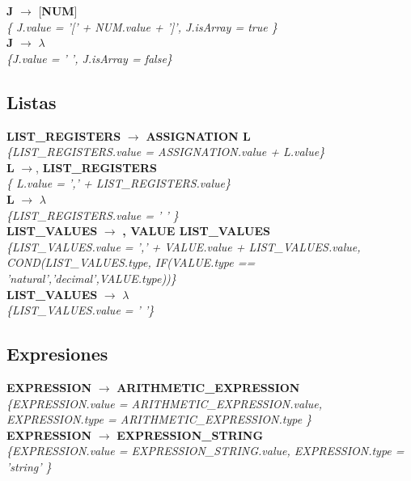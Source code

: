 \documentclass[10pt,a4paper]{article}
\begin{document}
\textbf{J} $\rightarrow$ [\textbf{NUM}] \\
\textit{\{ J.value = '[' + NUM.value + ']', J.isArray = true   \}} \\

\textbf{J} $\rightarrow$ $\lambda$   \\
\textit{\{J.value = ' ', J.isArray = false\}} \\

\subsection{Listas}
\textbf{LIST\_REGISTERS} $\rightarrow$ \textbf{ASSIGNATION L} \\
\textit{\{LIST\_REGISTERS.value =  ASSIGNATION.value + L.value\}} \\

\textbf{L} $\rightarrow$, \textbf{LIST\_REGISTERS} \\
\textit{\{ L.value = ',' + LIST\_REGISTERS.value\}} \\

\textbf{L} $\rightarrow$ $\lambda$\\
\textit{\{LIST\_REGISTERS.value =  ' ' \}}  \\ 

\textbf{LIST\_VALUES} $\rightarrow$ \textbf{, VALUE LIST\_VALUES} \\
\textit{\{LIST\_VALUES.value =  ',' + VALUE.value + LIST\_VALUES.value, COND(LIST\_VALUES.type, IF(VALUE.type == 'natural','decimal',VALUE.type))\}} \\

\textbf{LIST\_VALUES} $\rightarrow$ $\lambda$ \\
\textit{\{LIST\_VALUES.value = ' '\}} \\

\subsection{Expresiones}
\textbf{EXPRESSION} $\rightarrow$ \textbf{ARITHMETIC\_EXPRESSION} \\   
\textit{\{EXPRESSION.value =  ARITHMETIC\_EXPRESSION.value, EXPRESSION.type = ARITHMETIC\_EXPRESSION.type \}}  \\

\textbf{EXPRESSION} $\rightarrow$ \textbf{EXPRESSION\_STRING} \\
\textit{\{EXPRESSION.value =  EXPRESSION\_STRING.value, EXPRESSION.type = 'string' \}}  \\ 
\end{document}
